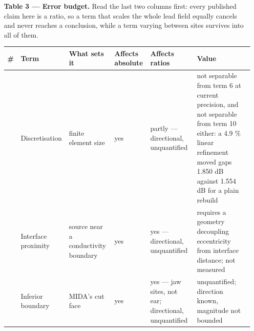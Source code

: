 \documentclass[
  11pt,
  a4paper,
]{article}
\newcounter{none} %
\begin{document}
\textbf{Table 3 --- Error budget.} Read the last two columns first: every published
claim here is a ratio, so a term that scales the whole lead field equally
cancels and never reaches a conclusion, while a term varying between sites
survives into all of them.

{\def\LTcaptype{none} %
\begin{longtable}[]{@{}
  >{\raggedright\arraybackslash}p{}
  >{\raggedright\arraybackslash}p{}
  >{\raggedright\arraybackslash}p{}
  >{\raggedright\arraybackslash}p{}
  >{\raggedright\arraybackslash}p{}
  >{\raggedright\arraybackslash}p{}@{}}
\toprule\noalign{}
\begin{minipage}[b]{\linewidth}\raggedright
\#
\end{minipage} & \begin{minipage}[b]{\linewidth}\raggedright
Term
\end{minipage} & \begin{minipage}[b]{\linewidth}\raggedright
What sets it
\end{minipage} & \begin{minipage}[b]{\linewidth}\raggedright
Affects absolute
\end{minipage} & \begin{minipage}[b]{\linewidth}\raggedright
Affects ratios
\end{minipage} & \begin{minipage}[b]{\linewidth}\raggedright
Value
\end{minipage} \\
\midrule\noalign{}
\endhead
\bottomrule\noalign{}
\endlastfoot
1 & Discretisation & finite element size & yes & partly --- directional, unquantified & not separable from term 6 at current precision, and not separable from term 10 either: a 4.9 \% linear refinement moved gaps 1.850 dB against 1.554 dB for a plain rebuild \\
2 & Interface proximity & source near a conductivity boundary & yes & yes --- directional, unquantified & requires a geometry decoupling eccentricity from interface distance; not measured \\
3 & Inferior boundary & MIDA's cut face & yes & yes --- jaw sites, not ear; directional, unquantified & unquantified; direction known, magnitude not bounded \\

\end{longtable}}
\end{document}
